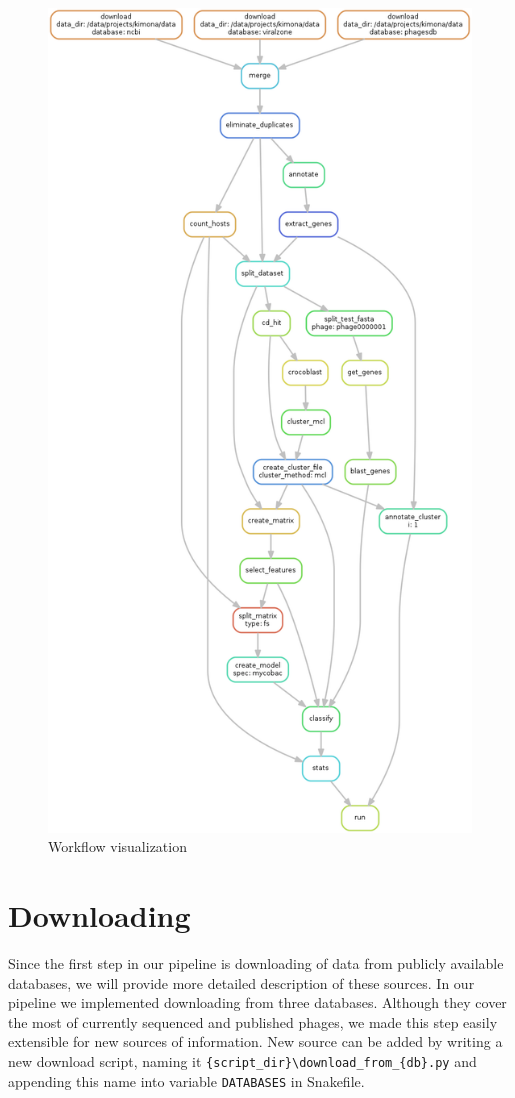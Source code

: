 \begin{figure}[h]
\includegraphics[height=\textheight]{./images/mcl.png}
\centering
\caption{Workflow visualization}
\label{fig:dag}
\end{figure}

\section{Downloading}
Since the first step in our pipeline is downloading of data from publicly available databases, we will provide more detailed description of these sources.
In our pipeline we implemented downloading from three databases.
Although they cover the most of currently sequenced and published phages, we made this step easily extensible for new sources of information.
New source can be added by writing a new download script, naming it \verb|{script_dir}\download_from_{db}.py| and appending this name into variable \verb|DATABASES| in Snakefile. 

